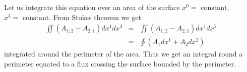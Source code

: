Let us integrate this equation over an area of the surface $x^0 = \mbox{ constant}$, $x^3 = \mbox{ constant}$. From 
Stokes theorem we get 
\begin{equation}
 \label{ecuacion 21.6}
 \begin{array}{rcl}
  \iint{\left( A_{1;2} - A_{2;1}\right)dx^1 dx^2} & = & \iint{\left( A_{1,2} - A_{2,1}\right)dx^1 dx^2}\\
  & = & \oint{ \left( A_1 dx^1 + A_2 dx^2 \right)}
 \end{array}
\end{equation}
integrated around the perimeter of the area. Thus we get an integral round a perimeter equated to a flux crossing the 
surface bounded by the perimeter.


